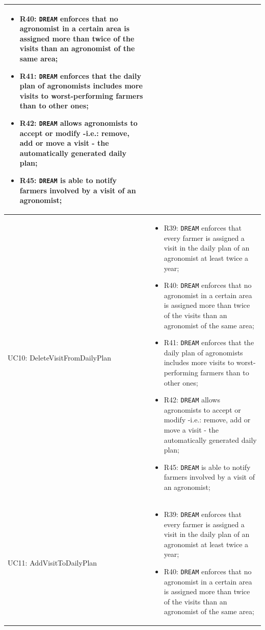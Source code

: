 \documentclass{article}
\begin{document}
\begin{longtable}[c]{|m{}|m{8cm}|}
\begin{itemize}
    \item R40: \verb|DREAM| enforces that no agronomist in a certain area is assigned more than twice of the visits than an agronomist of the same area;

    \item R41: \verb|DREAM| enforces that the daily plan of agronomists includes more visits to worst-performing farmers than to other ones;

    \item R42: \verb|DREAM| allows agronomists to accept or modify -i.e.: remove, add or move a visit - the automatically generated daily plan;

    \item R45: \verb|DREAM| is able to notify farmers involved by a visit of an agronomist;
\end{itemize}\\ \hline
\hline
UC10: DeleteVisitFromDailyPlan & 
\begin{itemize}
    \item R39: \verb|DREAM| enforces that every farmer is assigned a visit in the daily plan of an agronomist at least twice a year;

    \item R40: \verb|DREAM| enforces that no agronomist in a certain area is assigned more than twice of the visits than an agronomist of the same area;

    \item R41: \verb|DREAM| enforces that the daily plan of agronomists includes more visits to worst-performing farmers than to other ones;

    \item R42: \verb|DREAM| allows agronomists to accept or modify -i.e.: remove, add or move a visit - the automatically generated daily plan;

    \item R45: \verb|DREAM| is able to notify farmers involved by a visit of an agronomist;
\end{itemize}\\ \hline
\hline
UC11: AddVisitToDailyPlan & 
\begin{itemize}
    \item R39: \verb|DREAM| enforces that every farmer is assigned a visit in the daily plan of an agronomist at least twice a year;

    \item R40: \verb|DREAM| enforces that no agronomist in a certain area is assigned more than twice of the visits than an agronomist of the same area;


\end{itemize}
\end{longtable}
\end{document}
